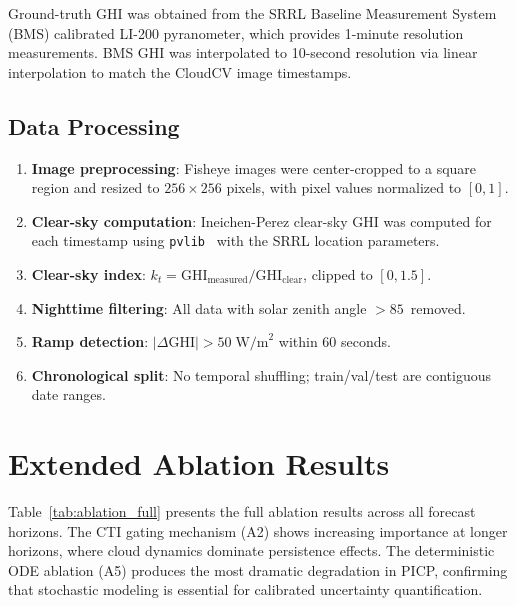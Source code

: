 \documentclass{article}
\begin{document}
Ground-truth GHI was obtained from the SRRL Baseline Measurement System (BMS) calibrated LI-200 pyranometer, which provides 1-minute resolution measurements. BMS GHI was interpolated to 10-second resolution via linear interpolation to match the CloudCV image timestamps.

\subsection{Data Processing}

\begin{enumerate}
    \item \textbf{Image preprocessing}: Fisheye images were center-cropped to a square region and resized to $256 \times 256$ pixels, with pixel values normalized to $[0, 1]$.
    \item \textbf{Clear-sky computation}: Ineichen-Perez clear-sky GHI was computed for each timestamp using \texttt{pvlib}~\citep{holmgren2018pvlib} with the SRRL location parameters.
    \item \textbf{Clear-sky index}: $k_t = \text{GHI}_{\text{measured}} / \text{GHI}_{\text{clear}}$, clipped to $[0, 1.5]$.
    \item \textbf{Nighttime filtering}: All data with solar zenith angle $> 85$\textdegree\ removed.
    \item \textbf{Ramp detection}: $|\Delta\text{GHI}| > 50\;\text{W/m}^2$ within 60 seconds.
    \item \textbf{Chronological split}: No temporal shuffling; train/val/test are contiguous date ranges.
\end{enumerate}

\section{Extended Ablation Results}
\label{app:ablation}

Table~\ref{tab:ablation_full} presents the full ablation results across all forecast horizons. The CTI gating mechanism (A2) shows increasing importance at longer horizons, where cloud dynamics dominate persistence effects. The deterministic ODE ablation (A5) produces the most dramatic degradation in PICP, confirming that stochastic modeling is essential for calibrated uncertainty quantification.
\end{document}
